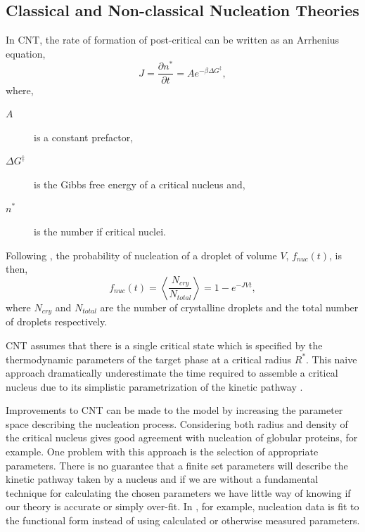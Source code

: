 \documentclass[showkeys, prb, reprint]{revtex4-1}
\newcommand{\f}{\frac}          %
\newcommand{\mean}[1]{\left\langle #1 \right\rangle}
\begin{document}
\subsection{Classical and Non-classical Nucleation Theories} %


In CNT, the rate of formation of post-critical can be written as an Arrhenius
equation,
%
\begin{equation}
    J = \f{\partial n^*}{\partial t} = A e^{-\beta\Delta G^{\ddagger}},
\end{equation}
where,
\begin{description}
    \item[$A$] is a constant prefactor,
    \item[$\Delta G^\ddagger$] is the Gibbs free energy of a critical nucleus
        and, 
    \item[$n^*$] is the number if critical nuclei.
\end{description}
% 
Following \cite{MYERSON04}, the probability of nucleation of a droplet of
volume $V$, $f_{nuc}(t)$, is then,
%
\begin{equation}
    f_{nuc}(t) = \mean{\f{N_{cry}}{N_{total}}} = 1 - e^{-J V t},
\end{equation}
%
where $N_{cry}$ and $N_{total}$ are the number of crystalline droplets and the
total number of droplets respectively.


CNT assumes that there is a single critical state which is specified by the
thermodynamic parameters of the target phase at a critical radius $R^*$. This
naive approach dramatically underestimate the time required to assemble a
critical nucleus due to its simplistic parametrization of the kinetic pathway
\cite{LUTSKO15, MYERSON04, MYERSON09}.

Improvements to CNT can be made to the model by increasing the parameter space
describing the nucleation process. Considering both radius and density of the
critical nucleus \cite{LUTSKO15} gives good agreement with nucleation of
globular proteins, for example. One problem with this approach is the selection
of appropriate parameters. There is no guarantee that a finite set parameters
will describe the kinetic pathway taken by a nucleus and if we are without a
fundamental technique for calculating the chosen parameters we have little way
of knowing if our theory is accurate or simply over-fit. In \cite{MYERSON09},
for example, nucleation data is fit to the functional form instead of using
calculated or otherwise measured parameters.
\end{document}
